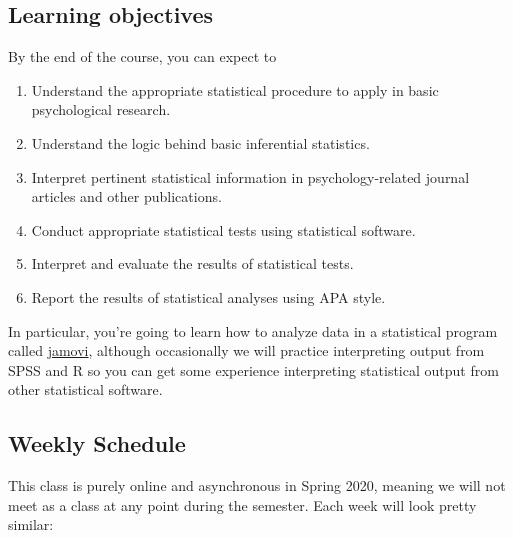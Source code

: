 \documentclass[
]{book}
\providecommand{\tightlist}{%
  \setlength{\itemsep}{0pt}\setlength{\parskip}{0pt}}
\begin{document}
\hypertarget{learning-objectives}{%
\subsection{Learning objectives}\label{learning-objectives}}

By the end of the course, you can expect to

\begin{enumerate}
\def\labelenumi{\arabic{enumi}.}
\tightlist
\item
  Understand the appropriate statistical procedure to apply in basic psychological research.
\item
  Understand the logic behind basic inferential statistics.
\item
  Interpret pertinent statistical information in psychology-related journal articles and other publications.
\item
  Conduct appropriate statistical tests using statistical software.
\item
  Interpret and evaluate the results of statistical tests.
\item
  Report the results of statistical analyses using APA style.
\end{enumerate}

In particular, you're going to learn how to analyze data in a statistical program called \href{https://www.jamovi.org/}{jamovi}, although occasionally we will practice interpreting output from SPSS and R so you can get some experience interpreting statistical output from other statistical software.

\hypertarget{weekly-schedule}{%
\subsection{Weekly Schedule}\label{weekly-schedule}}

This class is purely online and asynchronous in Spring 2020, meaning we will not meet as a class at any point during the semester. Each week will look pretty similar:
\end{document}
